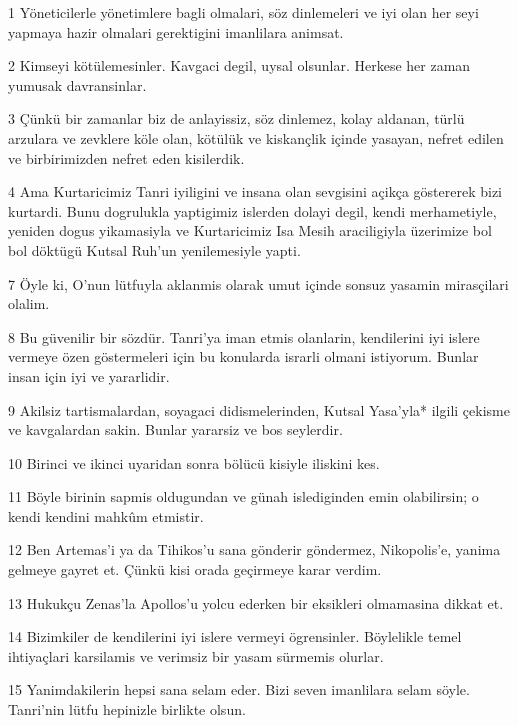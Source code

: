 \par 1 Yöneticilerle yönetimlere bagli olmalari, söz dinlemeleri ve iyi olan her seyi yapmaya hazir olmalari gerektigini imanlilara animsat.
\par 2 Kimseyi kötülemesinler. Kavgaci degil, uysal olsunlar. Herkese her zaman yumusak davransinlar.
\par 3 Çünkü bir zamanlar biz de anlayissiz, söz dinlemez, kolay aldanan, türlü arzulara ve zevklere köle olan, kötülük ve kiskançlik içinde yasayan, nefret edilen ve birbirimizden nefret eden kisilerdik.
\par 4 Ama Kurtaricimiz Tanri iyiligini ve insana olan sevgisini açikça göstererek bizi kurtardi. Bunu dogrulukla yaptigimiz islerden dolayi degil, kendi merhametiyle, yeniden dogus yikamasiyla ve Kurtaricimiz Isa Mesih araciligiyla üzerimize bol bol döktügü Kutsal Ruh'un yenilemesiyle yapti.
\par 7 Öyle ki, O'nun lütfuyla aklanmis olarak umut içinde sonsuz yasamin mirasçilari olalim.
\par 8 Bu güvenilir bir sözdür. Tanri'ya iman etmis olanlarin, kendilerini iyi islere vermeye özen göstermeleri için bu konularda israrli olmani istiyorum. Bunlar insan için iyi ve yararlidir.
\par 9 Akilsiz tartismalardan, soyagaci didismelerinden, Kutsal Yasa'yla* ilgili çekisme ve kavgalardan sakin. Bunlar yararsiz ve bos seylerdir.
\par 10 Birinci ve ikinci uyaridan sonra bölücü kisiyle iliskini kes.
\par 11 Böyle birinin sapmis oldugundan ve günah islediginden emin olabilirsin; o kendi kendini mahkûm etmistir.
\par 12 Ben Artemas'i ya da Tihikos'u sana gönderir göndermez, Nikopolis'e, yanima gelmeye gayret et. Çünkü kisi orada geçirmeye karar verdim.
\par 13 Hukukçu Zenas'la Apollos'u yolcu ederken bir eksikleri olmamasina dikkat et.
\par 14 Bizimkiler de kendilerini iyi islere vermeyi ögrensinler. Böylelikle temel ihtiyaçlari karsilamis ve verimsiz bir yasam sürmemis olurlar.
\par 15 Yanimdakilerin hepsi sana selam eder. Bizi seven imanlilara selam söyle. Tanri'nin lütfu hepinizle birlikte olsun.


